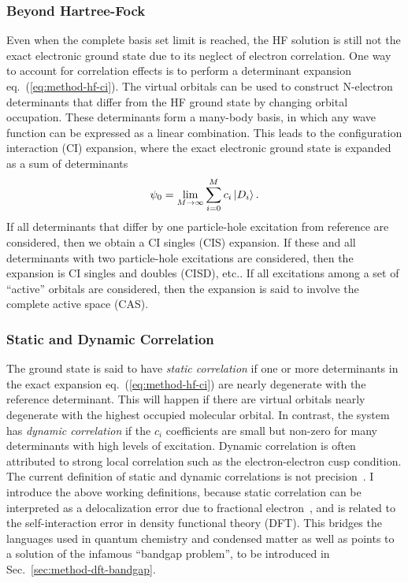 \subsubsection{Beyond Hartree-Fock}
Even when the complete basis set limit is reached, the HF solution is still not the exact electronic ground state due to its neglect of electron correlation.
One way to account for correlation effects is to perform a determinant expansion eq.~(\ref{eq:method-hf-ci}).
The virtual orbitals can be used to construct N-electron determinants that differ from the HF ground state by changing orbital occupation.
These determinants form a many-body basis, in which any wave function can be expressed as a linear combination.
This leads to the configuration interaction (CI) expansion, where the exact electronic ground state is expanded as a sum of determinants
\begin{align} \label{eq:method-hf-ci}
\psi_0 = \lim\limits_{M\rightarrow\infty}\sum\limits_{i=0}^{M} c_i \ket{D_i}.
\end{align}
If all determinants that differ by one particle-hole excitation from reference are considered, then we obtain a CI singles (CIS) expansion. If these and all determinants with two particle-hole excitations are considered, then the expansion is CI singles and doubles (CISD), etc.. If all excitations among a set of ``active'' orbitals are considered, then the expansion is said to involve the complete active space (CAS).

\subsubsection{Static and Dynamic Correlation}
The ground state is said to have \textit{static correlation} if one or more determinants in the exact expansion eq.~(\ref{eq:method-hf-ci}) are nearly degenerate with the reference determinant.
This will happen if there are virtual orbitals nearly degenerate with the highest occupied molecular orbital.
In contrast, the system has \textit{dynamic correlation} if the $c_i$ coefficients are small but non-zero for many determinants with high levels of excitation.
Dynamic correlation is often attributed to strong local correlation such as the electron-electron cusp condition.
The current definition of static and dynamic correlations is not precision~\cite{Benavides-Riveros2017}.
I introduce the above working definitions, because static correlation can be interpreted as a delocalization error due to fractional electron~\cite{Cohen2008}, and is related to the self-interaction error in density functional theory (DFT).
This bridges the languages used in quantum chemistry and condensed matter as well as points to a solution of the infamous ``bandgap problem'', to be introduced in  Sec.~\ref{sec:method-dft-bandgap}.


